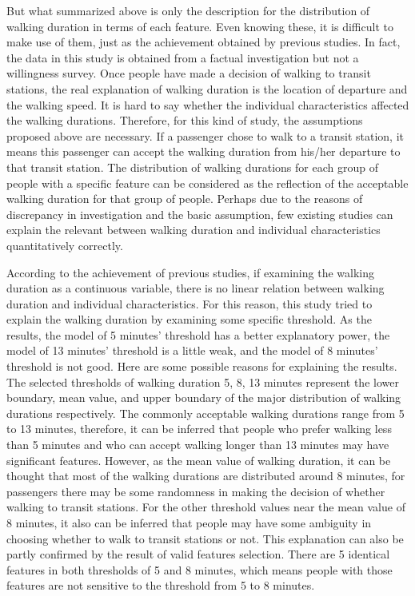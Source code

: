 \documentclass[Journal,letterpaper]{ascelike-new}
\begin{document}
%
But what summarized above is only the description for the distribution of walking duration in terms of each feature. Even knowing these, it is difficult to make use of them, just as the achievement obtained by previous studies. In fact, the data in this study is obtained from a factual investigation but not a willingness survey. Once people have made a decision of walking to transit stations, the real explanation of walking duration is the location of departure and the walking speed. It is hard to say whether the individual characteristics affected the walking durations. Therefore, for this kind of study, the assumptions proposed above are necessary. If a passenger chose to walk to a transit station, it means this passenger can accept the walking duration from his/her departure to that transit station. The distribution of walking durations for each group of people with a specific feature can be considered as the reflection of the acceptable walking duration for that group of people. Perhaps due to the reasons of discrepancy in investigation and the basic assumption, few existing studies can explain the relevant between walking duration and individual characteristics quantitatively correctly.

%
According to the achievement of previous studies, if examining the walking duration as a continuous variable, there is no linear relation between walking duration and individual characteristics. For this reason, this study tried to explain the walking duration by examining some specific threshold. As the results, the model of 5 minutes’ threshold has a better explanatory power, the model of 13 minutes' threshold is a little weak, and the model of 8 minutes' threshold is not good. Here are some possible reasons for explaining the results. The selected thresholds of walking duration 5, 8, 13 minutes represent the lower boundary, mean value, and upper boundary of the major distribution of walking durations respectively. The commonly acceptable walking durations range from 5 to 13 minutes, therefore, it can be inferred that people who prefer walking less than 5 minutes and who can accept walking longer than 13 minutes may have significant features. However, as the mean value of walking duration, it can be thought that most of the walking durations are distributed around 8 minutes, for passengers there may be some randomness in making the decision of whether walking to transit stations. For the other threshold values near the mean value of 8 minutes, it also can be inferred that people may have some ambiguity in choosing whether to walk to transit stations or not. This explanation can also be partly confirmed by the result of valid features selection. There are 5 identical features in both thresholds of 5 and 8 minutes, which means people with those features are not sensitive to the threshold from 5 to 8 minutes.
\end{document}
